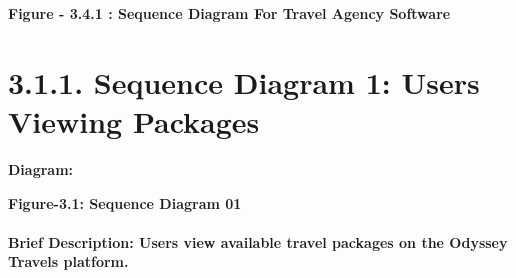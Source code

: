 \documentclass{scrreprt}
\begin{document}
\begin{center}
    \parbox{0.8\textwidth}{ 
        \centering
        \textbf{Figure - 3.4.1 : Sequence Diagram For Travel Agency Software}
    }
\end{center}

\section*{\textbf{3.1.1. Sequence Diagram 1: Users Viewing Packages}}
\textbf{Diagram:}
\newline
\newline
\begin{center}
    \parbox{0.8\textwidth}{ 
        \centering
    }
\end{center}

\begin{center}
    \parbox{0.8\textwidth}{ 
        \centering
        \textbf{Figure-3.1: Sequence Diagram 01}
    }
\end{center}

\paragraph {\textnormal{Brief Description: 
Users view available travel packages on the Odyssey Travels platform.}}
\end{document}
